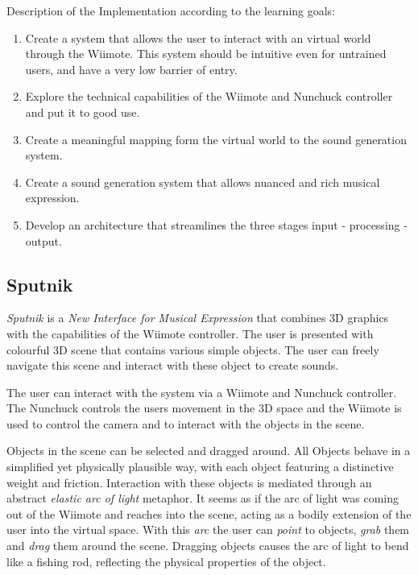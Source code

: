 \documentclass[10pt,a4paper]{scrartcl}
\begin{document}
Description of the Implementation according to the learning goals:

\begin{enumerate}
\item Create a system that allows the user to interact with an virtual world through the Wiimote. This system should be intuitive even for untrained users, and have a very low barrier of entry.

\item Explore the technical capabilities of the Wiimote and Nunchuck controller and put it to good use.

\item Create a meaningful mapping form the virtual world to the sound generation system.

\item Create a sound generation system that allows nuanced and rich musical expression.
\item  Develop an architecture that streamlines the three stages input - processing - output.
\end{enumerate}

\subsection{Sputnik}

\emph{Sputnik} is a \emph{New Interface for Musical Expression} that combines 3D graphics with the capabilities of the Wiimote controller. The user is presented with colourful 3D scene that contains various simple objects. The user can freely navigate this scene and interact with these object to create sounds.

The user can interact with the system via a Wiimote and Nunchuck controller. The Nunchuck controls the users movement in the 3D space and the Wiimote is used to control the camera and to interact with the objects in the scene. 

Objects in the scene can be selected and dragged around. All Objects behave in a simplified yet physically plausible way, with each object featuring a distinctive weight and friction. Interaction with these objects is mediated through an abstract \emph{elastic arc of light} metaphor. It seems as if the arc of light was coming out of the Wiimote and reaches into the scene, acting as a bodily extension of the user into the virtual space. With this \emph{arc} the user can \emph{point} to objects, \emph{grab} them and \emph{drag} them around the scene. Dragging objects causes the arc of light to bend like a fishing rod, reflecting the physical properties of the object.
\end{document}

